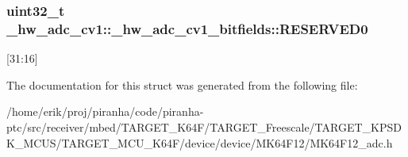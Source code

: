 \subsubsection[{\texorpdfstring{R\+E\+S\+E\+R\+V\+E\+D0}{RESERVED0}}]{\setlength{\rightskip}{0pt plus 5cm}uint32\+\_\+t \+\_\+hw\+\_\+adc\+\_\+cv1\+::\+\_\+hw\+\_\+adc\+\_\+cv1\+\_\+bitfields\+::\+R\+E\+S\+E\+R\+V\+E\+D0}\hypertarget{struct__hw__adc__cv1_1_1__hw__adc__cv1__bitfields_a26238fc7824125d0d1201b088e9f14e2}{}\label{struct__hw__adc__cv1_1_1__hw__adc__cv1__bitfields_a26238fc7824125d0d1201b088e9f14e2}
\mbox{[}31\+:16\mbox{]} 

The documentation for this struct was generated from the following file\+:\begin{DoxyCompactItemize}
\item 
/home/erik/proj/piranha/code/piranha-\/ptc/src/receiver/mbed/\+T\+A\+R\+G\+E\+T\+\_\+\+K64\+F/\+T\+A\+R\+G\+E\+T\+\_\+\+Freescale/\+T\+A\+R\+G\+E\+T\+\_\+\+K\+P\+S\+D\+K\+\_\+\+M\+C\+U\+S/\+T\+A\+R\+G\+E\+T\+\_\+\+M\+C\+U\+\_\+\+K64\+F/device/device/\+M\+K64\+F12/M\+K64\+F12\+\_\+adc.\+h\end{DoxyCompactItemize}
